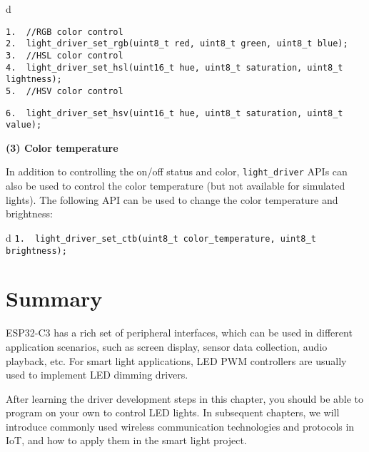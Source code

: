 \documentclass[a4paper,12pt]{book}
\begin{document}
\begin{codebloc}
\begin{tabular}{d}
\vspace{2pt}
\begin{verbatim}
1.  //RGB color control
2.  light_driver_set_rgb(uint8_t red, uint8_t green, uint8_t blue);
3.  //HSL color control
4.  light_driver_set_hsl(uint16_t hue, uint8_t saturation, uint8_t lightness);
5.  //HSV color control
\end{verbatim}
\verb|6.  light_driver_set_hsv(uint16_t hue, uint8_t saturation, uint8_t value);|
\end{tabular}
\end{codebloc}

\vspace{2pt}
\textbf{(3)	Color temperature}

In addition to controlling the on/off status and color, \verb|light_driver| APIs can also be used to control the color temperature (but not available for simulated lights). The following API can be used to change the color temperature and brightness:

\begin{codebloc}
\begin{tabular}{d}
\verb|1.  light_driver_set_ctb(uint8_t color_temperature, uint8_t brightness);|
\end{tabular}
\end{codebloc}


\section{Summary}
ESP32-C3 has a rich set of peripheral interfaces, which can be used in different application scenarios, such as screen display, sensor data collection, audio playback, etc. For smart light applications, LED PWM controllers are usually used to implement LED dimming drivers.

After learning the driver development steps in this chapter, you should be able to program on your own to control LED lights. In subsequent chapters, we will introduce commonly used wireless communication technologies and protocols in IoT, and how to apply them in the smart light project.
\end{document}
